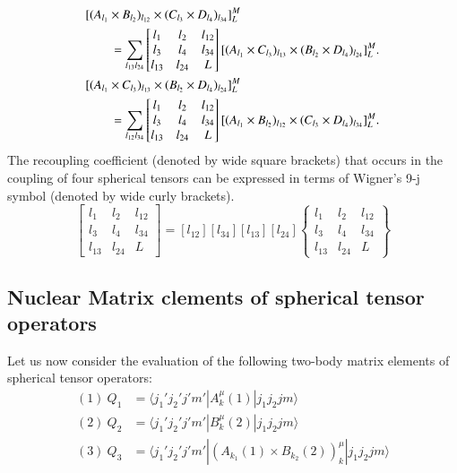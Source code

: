 \begin{align}
& [(A_{l_1} \times B_{l_2})_{l_{12}} \times (C_{l_3} \times D_{l_4})_{l_{34}}]^M_L \notag \\
& \qquad = \sum_{l_{13} l_{24}}
	\begin{bmatrix}l_1 & l_2 & l_{12}\\l_3 & l_4 & l_{34}\\l_{13} & l_{24} & L\end{bmatrix}
	 [(A_{l_1} \times C_{l_3})_{l_{13}} \times (B_{l_2} \times D_{l_4})_{l_{24}}]^M_L. \label{chap3-eq10}\\
& [(A_{l_1} \times C_{l_3})_{l_{13}} \times (B_{l_2} \times D_{l_4})_{l_{24}}]^M_L  \notag \\
& \qquad = \sum_{l_{12} l_{34}}
	\begin{bmatrix}l_1 & l_2 & l_{12}\\l_3 & l_4 & l_{34}\\l_{13} & l_{24} & L\end{bmatrix} 
	 [(A_{l_1} \times B_{l_2})_{l_{12}} \times (C_{l_3} \times D_{l_4})_{l_{34}}]^M_L. \label{chap3-eq11}
\end{align}
The recoupling coefficient (denoted by wide square brackets) that occurs in the coupling of four spherical tensors can be expressed in terms of Wigner's 9-j symbol (denoted by wide curly brackets).
\begin{equation}
	\begin{bmatrix}l_1 & l_2 & l_{12}\\l_3 & l_4 & l_{34}\\l_{13} & l_{24} & L\end{bmatrix} 
	= [l_{12}] [l_{34}] [l_{13}] [l_{24}] 
	\left\{\begin{matrix}l_1 & l_2 & l_{12}\\l_3 & l_4 & l_{34}\\l_{13} & l_{24} & L\end{matrix} \right\} \label{chap3-eq12}
\end{equation}

\subsection{Nuclear Matrix clements of spherical tensor operators}\label{chap3-sec2.1}

Let us now consider the evaluation of the following two-body matrix elements of spherical tensor operators:
\begin{align}
(1) ~ Q_1 & = \langle j_1' j_2' j' m' |A_k^\mu (1)| j_1 j_2 j m \rangle \label{chap3-eq13}\\
(2) ~ Q_2 & = \langle j_1' j_2' j' m' |B_k^\mu (2)| j_1 j_2 j m \rangle \label{chap3-eq14}\\
(3) ~ Q_3 & = \langle j_1' j_2' j' m' |(A_{k_1} (1) \times B_{k_2} (2))_k^\mu  | j_1 j_2 j m \rangle \label{chap3-eq15}
\end{align}

